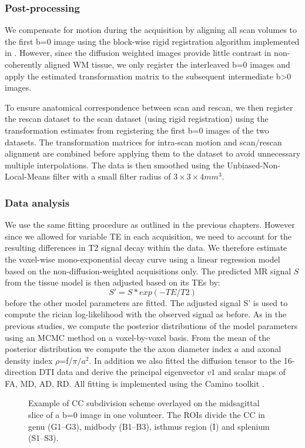 \subsubsection*{Post-processing}
We compensate for motion during the acquisition by aligning all scan volumes to the first b=0 image using the block-wise rigid registration algorithm \citep{Ourselin:2001} implemented in \citep{Modat:2010}. However, since the diffusion weighted images provide little contrast in non-coherently aligned WM tissue, we only register the interleaved b=0 images and apply the estimated transformation matrix to the subsequent intermediate b>0 images.   

To ensure anatomical correspondence between scan and rescan, we then register the rescan dataset to the scan dataset (using rigid registration) using the transformation estimates from registering  the first b=0 images of the two datasets. The transformation matrices for intra-scan motion and scan/rescan alignment are combined before applying them to the dataset to avoid unnecessary multiple interpolations. The data is then smoothed using the Unbiased-Non-Local-Means filter \citep{Tristan-Vega:2012} with a small filter radius of $3\times3\times4 mm^3$.

\subsubsection*{Data analysis}
We use the same fitting procedure as outlined in the previous chapters. However since we allowed for variable TE in each acquisition, we need to account for the resulting differences in T2 signal decay within the data. We therefore estimate the voxel-wise mono-exponential decay curve using a linear regression model based on the non-diffusion-weighted acquisitions only. The predicted MR signal $S$ from the tissue model is then adjusted based on its \glspl{TE} by:
\begin{equation}
	S' = S * exp(-TE/T2)
\end{equation}
before the other model parameters are fitted. The adjusted signal S' is used to compute the rician log-likelihood with the observed signal as before. As in the previous studies, we compute the posterior distributions of the model parameters using an MCMC method on a voxel-by-voxel basis. From the mean of the posterior distribution we compute the the axon diameter index $a$ and axonal density index $\rho$=f/$\pi/a^2$. In addition we also fitted the diffusion tensor to the 16-direction DTI data and derive the principal eigenvector $v1$ and scalar maps of FA, MD, AD, RD. All fitting is implemented using the Camino toolkit \citep{Cook:2006}.
\begin{figure}[ht]
	\centering
	\caption{Example of CC subdivision scheme overlayed on the midsagittal slice of a b=0 image in one volunteer. The ROIs divide the CC in genu (G1--G3), midbody (B1--B3), isthmus region (I) and splenium (S1--S3).}
	\label{fig:chap9 CC ROIs}
\end{figure}
